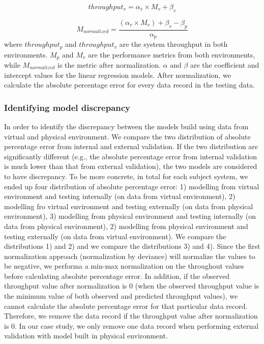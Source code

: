 \begin{equation*}
throughput_{v}= \alpha_{v} \times M_{v} + \beta_{v}
\end{equation*}

\begin{equation*}
M_{normalized} = \frac{(\alpha_{v} \times M_{v})+\beta_{v}-\beta_{p}}{\alpha_{p}}
	\end{equation*}
where $throughput_{p}$ and $throughput_{v}$ are the system throughput in both environments. $M_{p}$ and $M_{v}$ are the performance metrics from both environments, while $M_{normalized}$ is the metric after normalization. $\alpha$ and $\beta$ are the coefficient and intercept values for the linear regression models. After normalization, we calculate the absolute percentage error for every data record in the testing data.






\subsubsection{Identifying model discrepancy}
In order to identify the discrepancy between the models build using data from virtual and physical environment. We compare the two distribution of absolute percentage error from internal and external validation. If the two distribution are significantly different (e.g., the absolute percentage error from internal validation is much lower than that from external validation), the two models are considered to have discrepancy. To be more concrete, in total for each subject system, we ended up four distribution of absolute percentage error: 1) modelling from virtual environment and testing internally (on data from virtual environment), 2) modelling fro virtual environment and testing externally (on data from physical environment), 3) modelling from physical environment and testing internally (on data from physical environment), 2) modelling from physical environment and testing externally (on data from virtual environment). We compare the distributions 1) and 2) and we compare the distributions 3) and 4). Since the first normalization approach (normalization by deviance) will normalize the values to be negative, we performa a min-max normalization on the throughout values before calculating absolute percentage error. In addition, if the observed throughput value after normalization is 0 (when the observed throughput value is the minimum value of both observed and predicted throughput values), we cannot calculate the absolute percentage error for that particular data record. Therefore, we remove the data record if the throughput value after normalization is 0. In our case study, we only remove one data record when performing external validation with model built in physical environment. 




